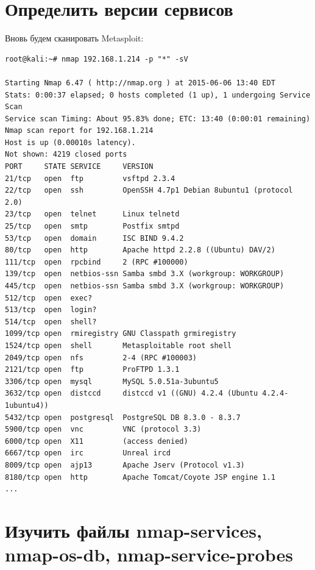 \documentclass[utf8x, 12pt]{G7-32}
\begin{document}
\newpage
\section{Определить версии сервисов}

Вновь будем сканировать Metasploit:

\begin{lstlisting}
root@kali:~# nmap 192.168.1.214 -p "*" -sV

Starting Nmap 6.47 ( http://nmap.org ) at 2015-06-06 13:40 EDT
Stats: 0:00:37 elapsed; 0 hosts completed (1 up), 1 undergoing Service Scan
Service scan Timing: About 95.83% done; ETC: 13:40 (0:00:01 remaining)
Nmap scan report for 192.168.1.214
Host is up (0.00010s latency).
Not shown: 4219 closed ports
PORT     STATE SERVICE     VERSION
21/tcp   open  ftp         vsftpd 2.3.4
22/tcp   open  ssh         OpenSSH 4.7p1 Debian 8ubuntu1 (protocol 2.0)
23/tcp   open  telnet      Linux telnetd
25/tcp   open  smtp        Postfix smtpd
53/tcp   open  domain      ISC BIND 9.4.2
80/tcp   open  http        Apache httpd 2.2.8 ((Ubuntu) DAV/2)
111/tcp  open  rpcbind     2 (RPC #100000)
139/tcp  open  netbios-ssn Samba smbd 3.X (workgroup: WORKGROUP)
445/tcp  open  netbios-ssn Samba smbd 3.X (workgroup: WORKGROUP)
512/tcp  open  exec?
513/tcp  open  login?
514/tcp  open  shell?
1099/tcp open  rmiregistry GNU Classpath grmiregistry
1524/tcp open  shell       Metasploitable root shell
2049/tcp open  nfs         2-4 (RPC #100003)
2121/tcp open  ftp         ProFTPD 1.3.1
3306/tcp open  mysql       MySQL 5.0.51a-3ubuntu5
3632/tcp open  distccd     distccd v1 ((GNU) 4.2.4 (Ubuntu 4.2.4-1ubuntu4))
5432/tcp open  postgresql  PostgreSQL DB 8.3.0 - 8.3.7
5900/tcp open  vnc         VNC (protocol 3.3)
6000/tcp open  X11         (access denied)
6667/tcp open  irc         Unreal ircd
8009/tcp open  ajp13       Apache Jserv (Protocol v1.3)
8180/tcp open  http        Apache Tomcat/Coyote JSP engine 1.1
...
\end{lstlisting}


\newpage
\section{Изучить файлы nmap-services, nmap-os-db, nmap-service-probes}
\end{document}
